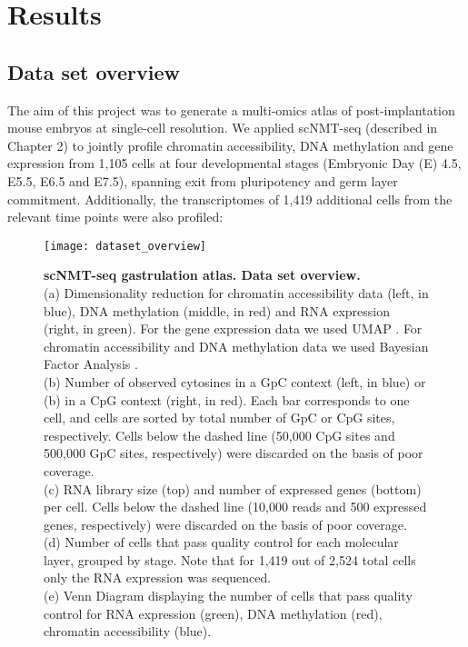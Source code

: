 \graphicspath{{Chapter3/Figs/}}

\section{Results}

\subsection{Data set overview}

The aim of this project was to generate a multi-omics atlas of post-implantation mouse embryos at single-cell resolution. We applied scNMT-seq (described in Chapter 2) to jointly profile chromatin accessibility, DNA methylation and gene expression from 1,105 cells at four developmental stages (Embryonic Day (E) 4.5, E5.5, E6.5 and E7.5), spanning exit from pluripotency and germ layer commitment. Additionally, the transcriptomes of 1,419 additional cells from the relevant time points were also profiled:

\begin{figure}[H]
	\centering
	\texttt{[image: dataset\_overview]}
	\caption[]{\textbf{scNMT-seq gastrulation atlas. Data set overview.}\\
	(a) Dimensionality reduction for chromatin accessibility data (left, in blue), DNA methylation (middle, in red) and RNA expression (right, in green). For the gene expression data we used UMAP \cite{McInnes2018}. For chromatin accessibility and DNA methylation data we used Bayesian Factor Analysis \cite{Argelaguet2018}.\\
	(b) Number of observed cytosines in a GpC context (left, in blue) or (b) in a CpG context (right, in red). Each bar corresponds to one cell, and cells are sorted by total number of GpC or CpG sites, respectively. Cells below the dashed line (50,000 CpG sites and 500,000 GpC sites, respectively) were discarded on the basis of poor coverage. \\
	(c) RNA library size (top) and number of expressed genes (bottom) per cell. Cells below the dashed line (10,000 reads and 500 expressed genes, respectively) were discarded on the basis of poor coverage. \\
	(d) Number of cells that pass quality control for each molecular layer, grouped by stage. Note that for 1,419 out of 2,524 total cells only the RNA expression was sequenced.\\
	(e) Venn Diagram displaying the number of cells that pass quality control for RNA expression (green), DNA methylation (red), chromatin accessibility (blue).
	}
	\label{fig:dataset_overview}
\end{figure}



